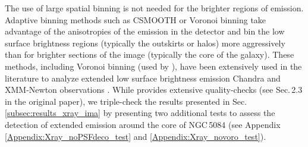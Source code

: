 \documentclass[modern]{CORE-AAS/aastex631}
\begin{document}
The use of large spatial binning is not needed for the brighter regions of emission. Adaptive binning methods such as CSMOOTH \citep{ebeling+2006mnras368_65} or Voronoi binning \citep{cappellari+2003mnras342_345, diehl+2006mnras368_497} take advantage of the anisotropies of the emission in the detector and bin the low surface brightness regions (typically the outskirts or halos) more aggressively than for brighter sections of the image (typically the core of the galaxy). These methods, including Voronoi binning (used by \SAUNAS), have been extensively used in the literature to analyze extended low surface brightness emission Chandra and XMM-Newton observations \citep[see ][and references therein]{ebeling+2007apj661_33,gonzalezmartin+2009aap506_1107,broos+2010apj714_1582, ebeling+2010mnras407_83, xue+2011apj195_10, hodgeskluck+2012apj746_167, wang+2024apj962_188}. While \citet[][\SAUNAS\, I]{borlaff+2024apj967_169} provides extensive quality-checks (see Sec.\,2.3 in the original paper), we triple-check the results presented in Sec.\,\ref{subsec:results_xray_ima} by presenting two additional tests to assess the detection of extended emission around the core of NGC\,5084 (see Appendix \ref{Appendix:Xray_noPSFdeco_test} and \ref{Appendix:Xray_novoro_test}).
\end{document}

